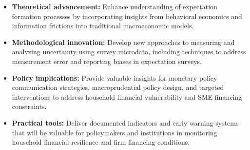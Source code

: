 \documentclass[11pt,a4paper]{article}
\begin{document}
\begin{itemize}[wide=0pt]
    \item \textbf{Theoretical advancement:} Enhance understanding of expectation formation processes by incorporating insights from behavioral economics and information frictions into traditional macroeconomic models.
    
    \item \textbf{Methodological innovation:} Develop new approaches to measuring and analyzing uncertainty using survey microdata, including techniques to address measurement error and reporting biases in expectation surveys.
    
    \item \textbf{Policy implications:} Provide valuable insights for monetary policy communication strategies, macroprudential policy design, and targeted interventions to address household financial vulnerability and SME financing constraints.
    
    \item \textbf{Practical tools:} Deliver documented indicators and early warning systems that will be valuable for policymakers and institutions in monitoring household financial resilience and firm financing conditions.
\end{itemize}
\end{document}

